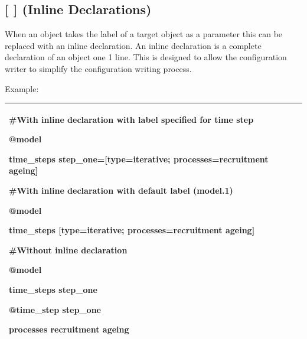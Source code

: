 \documentclass[a4paper,11pt,twoside,pdftex,draft]{article}
\begin{document}
\hypertarget{inline-declarations}{%
\subsection{{[} {]} (Inline Declarations)}\label{inline-declarations}}

When an object takes the label of a target object as a parameter this
can be replaced with an inline declaration. An inline declaration is a
complete declaration of an object one 1 line. This is designed to allow
the configuration writer to simplify the configuration writing process.

Example:

\begin{longtable}[]{@{}l@{}}
\toprule
\endhead
\begin{minipage}[t]{0.97\columnwidth}\raggedright
\#With inline declaration with label specified for time step

@model

time\_steps step\_one={[}type=iterative; processes=recruitment ageing{]}

\#With inline declaration with default label (model.1)

@model

time\_steps {[}type=iterative; processes=recruitment ageing{]}

\#Without inline declaration

@model

time\_steps step\_one

@time\_step step\_one

processes recruitment ageing\strut
\end{minipage}\tabularnewline
\bottomrule
\end{longtable}
\end{document}

